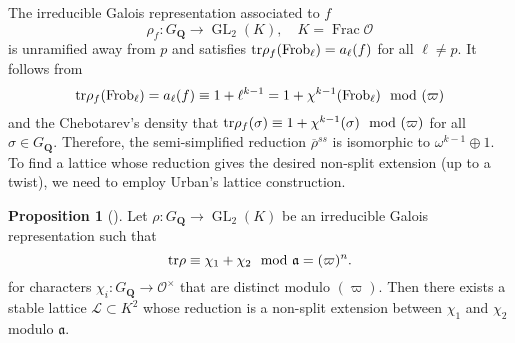 \documentclass[11pt]{amsart}
\newcommand{\Q}{\mathbf{Q}}  %
\newcommand{\ir}{\mathcal{O}} %
\newcommand{\tr}{{\rm tr}} %
\newcommand{\gl}{\operatorname{GL}}
\newcommand{\frob}{\operatorname{Frob}}
\newcommand{\totfrac}{\operatorname{Frac}}
\theoremstyle{definition}
\theoremstyle{definition}
\theoremstyle{definition}
\newtheorem{proposition}[definition]{Proposition}
\theoremstyle{definition}
\theoremstyle{definition}
\theoremstyle{definition}
\begin{document}
The irreducible Galois representation associated to $f$
\begin{equation*}
    \rho_f\colon G_\Q\to \gl_2(K),\quad K=\totfrac \ir
\end{equation*}
is unramified away from $p$ and satisfies
$\tr\rho_f(\frob_\ell)=a_\ell(f)$ for all $\ell\neq p$.
It follows from
\begin{equation}\label{cong}
    \tr\rho_f(\frob_\ell)=a_\ell(f)\equiv
    1+\ell^{k-1}=1+\chi^{k-1}(\frob_\ell)\mod (\varpi)
\end{equation}
and the Chebotarev's density that
$\tr\rho_f(\sigma)\equiv 1+\chi^{k-1}(\sigma)\mod (\varpi)$ for all $\sigma\in G_\Q$.
Therefore, the semi-simplified reduction $\overline{\rho}^{ss}$
is isomorphic to $\omega^{k-1}\oplus 1$. To find a lattice whose reduction
gives the desired non-split extension (up to a twist),
we need to employ Urban's lattice construction.
\begin{proposition}[\cite{Ur}]
   Let $\rho\colon G_\Q\to \gl_2(K)$
   be an irreducible Galois representation such that
   \begin{equation*}
       \tr\rho\equiv \chi_1+\chi_2 \mod \mathfrak{a}= (\varpi)^n.
   \end{equation*}
   for characters
    $\chi_i\colon G_\Q\to \ir^\times$ that are distinct modulo $(\varpi)$.
   Then there exists a stable lattice $\mathcal{L}\subset K^2$ whose reduction
   is a non-split extension between
   $\chi_1$ and $\chi_2$ modulo $\mathfrak{a}$.
\end{proposition}
\end{document}
